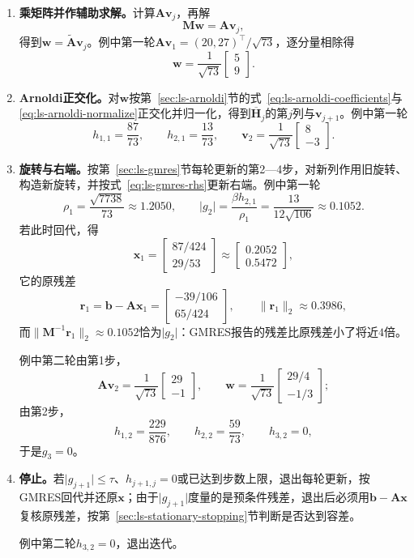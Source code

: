 \begin{enumerate}
 \item \textbf{乘矩阵并作辅助求解。}计算$\bm A\bm v_j$，再解
 \[
  \bm M\bm w=\bm A\bm v_j ,
 \]
 得到$\bm w=\widetilde{\bm A}\bm v_j$。例中第一轮$\bm A\bm v_1=(20,27)^\top/\sqrt{73}$，逐分量相除得
 \[
  \bm w=\frac1{\sqrt{73}}\begin{bmatrix}5\\9\end{bmatrix}.
 \]

 \item \textbf{Arnoldi正交化。}对$\bm w$按第~\ref{sec:ls-arnoldi}节的式~\eqref{eq:ls-arnoldi-coefficients}与\eqref{eq:ls-arnoldi-normalize}正交化并归一化，得到$\overline{\bm H}_j$的第$j$列与$\bm v_{j+1}$。例中第一轮
 \[
  h_{1,1}=\frac{87}{73},\qquad h_{2,1}=\frac{13}{73},\qquad \bm v_2=\frac1{\sqrt{73}}\begin{bmatrix}8\\-3\end{bmatrix}.
 \]

 \item \textbf{旋转与右端。}按第~\ref{sec:ls-gmres}节每轮更新的第2—4步，对新列作用旧旋转、构造新旋转，并按式~\eqref{eq:ls-gmres-rhs}更新右端。例中第一轮
 \[
  \rho_1=\frac{\sqrt{7738}}{73}\approx1.2050,\qquad
  \lvert g_2\rvert=\frac{\beta h_{2,1}}{\rho_1}=\frac{13}{12\sqrt{106}}\approx0.1052 .
 \]
 若此时回代，得
 \[
  \bm x_1=\begin{bmatrix}87/424\\29/53\end{bmatrix}\approx\begin{bmatrix}0.2052\\0.5472\end{bmatrix},
 \]
 它的原残差
 \[
  \bm r_1=\bm b-\bm A\bm x_1=\begin{bmatrix}-39/106\\65/424\end{bmatrix},\qquad \lVert\bm r_1\rVert_2\approx0.3986,
 \]
 而$\lVert\bm M^{-1}\bm r_1\rVert_2\approx0.1052$恰为$\lvert g_2\rvert$：GMRES报告的残差比原残差小了将近$4$倍。

 例中第二轮由第1步，
 \[
  \bm A\bm v_2=\frac1{\sqrt{73}}\begin{bmatrix}29\\-1\end{bmatrix},\qquad
  \bm w=\frac1{\sqrt{73}}\begin{bmatrix}29/4\\-1/3\end{bmatrix};
 \]
 由第2步，
 \[
  h_{1,2}=\frac{229}{876},\qquad h_{2,2}=\frac{59}{73},\qquad h_{3,2}=0 ,
 \]
 于是$g_3=0$。

 \item \textbf{停止。}若$\lvert g_{j+1}\rvert\le\tau$、$h_{j+1,j}=0$或已达到步数上限，退出每轮更新，按GMRES回代并还原$\bm x$；由于$\lvert g_{j+1}\rvert$度量的是预条件残差，退出后必须用$\bm b-\bm A\bm x$复核原残差，按第~\ref{sec:ls-stationary-stopping}节判断是否达到容差。

 例中第二轮$h_{3,2}=0$，退出迭代。
\end{enumerate}

